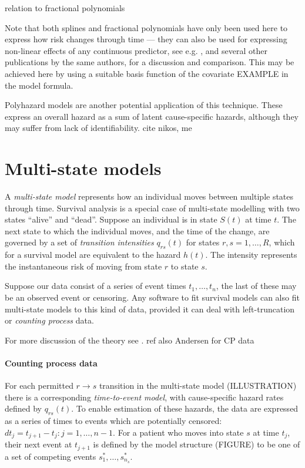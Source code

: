 \documentclass[nojss,nofooter]{jss}
\begin{document}
relation to fractional polynomials \citep{royston1994regression}

Note that both splines and fractional polynomials have only been used
here to express how risk changes through time --- they can also be
used for expressing non-linear effects of any continuous predictor,
see e.g. \citet{sauerbrei2007selection}, and several other
publications by the same authors, for a discussion and comparison.
This may be achieved here by using a suitable basis function of the
covariate EXAMPLE in the model formula.

Polyhazard models \citep{polyhazard} are another potential application
of this technique.  These express an overall hazard as a sum of latent
cause-specific hazards, although they may suffer from lack of
identifiability.  cite nikos, me

\section{Multi-state models}

A \emph{multi-state model} represents how an individual moves between
multiple states through time.  Survival analysis is a special case of
multi-state modelling with two states ``alive'' and ``dead''. Suppose
an individual is in state $S(t)$ at time $t$.  The next state to which
the individual moves, and the time of the change, are governed by a
set of \emph{transition intensities} $q_{rs}(t)$ for states $r, s =
1,\dots,R$, which for a survival model are equivalent to the hazard
$h(t)$.  The intensity represents the instantaneous risk of moving
from state $r$ to state $s$.

Suppose our data consist of a series of event times $t_{1},\dots,
t_{n}$, the last of these may be an observed event or censoring.  Any
software to fit survival models can also fit multi-state models to
this kind of data, provided it can deal with left-truncation or
\emph{counting process} data.

For more discussion of the theory see \citet{putter:mstate}. ref also
Andersen for CP data

\paragraph{Counting process data}
For each permitted $r \rightarrow s$ transition in the multi-state
model (ILLUSTRATION) there is a corresponding \emph{time-to-event
  model}, with cause-specific hazard rates defined by $q_{rs}(t)$. To
enable estimation of these hazards, the data are expressed as a series
of times to events which are potentially censored: $dt_{j} = t_{j+1} -
t_{j}: j = 1,\ldots,n-1$. For a patient who moves into state $s$ at
time $t_{j}$, their next event at $t_{j+1}$ is defined by the model
structure (FIGURE) to be one of a set of
competing events $s^*_1,\ldots,s^*_{n_s}$.
\end{document}

